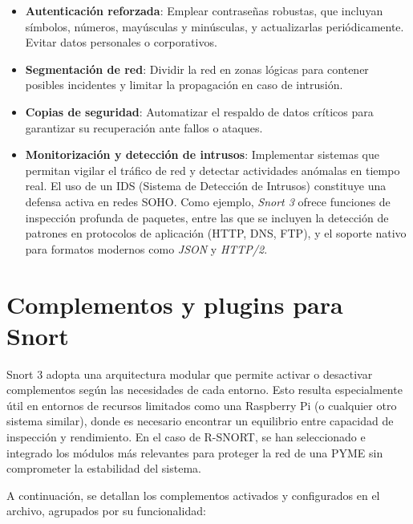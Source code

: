\documentclass[11pt,a4paper,twoside]{report}
\begin{document}
\begin{itemize}[itemsep=6pt]
	\item \textbf{Autenticación reforzada}: Emplear contraseñas robustas, que incluyan símbolos, números, mayúsculas y minúsculas, y actualizarlas periódicamente. Evitar datos personales o corporativos.
	
	\item \textbf{Segmentación de red}: Dividir la red en zonas lógicas para contener posibles incidentes y limitar la propagación en caso de intrusión.
	
	\item \textbf{Copias de seguridad}: Automatizar el respaldo de datos críticos para garantizar su recuperación ante fallos o ataques.
	
	\item \textbf{Monitorización y detección de intrusos}: Implementar sistemas que permitan vigilar el tráfico de red y detectar actividades anómalas en tiempo real. El uso de un IDS (Sistema de Detección de Intrusos) constituye una defensa activa en redes SOHO. Como ejemplo, \textit{Snort 3} ofrece funciones de inspección profunda de paquetes, entre las que se incluyen la detección de patrones en protocolos de aplicación (HTTP, DNS, FTP), y el soporte nativo para formatos modernos como \textit{JSON} y \textit{HTTP/2}.
\end{itemize}

\section{Complementos y plugins para Snort}

Snort 3 adopta una arquitectura modular que permite activar o desactivar complementos según las necesidades de cada entorno. Esto resulta especialmente útil en entornos de recursos limitados como una Raspberry Pi (o cualquier otro sistema similar), donde es necesario encontrar un equilibrio entre capacidad de inspección y rendimiento. En el caso de R-SNORT, se han seleccionado e integrado los módulos más relevantes para proteger la red de una PYME sin comprometer la estabilidad del sistema.\newline

A continuación, se detallan los complementos activados y configurados en el archivo, agrupados por su funcionalidad:
\end{document}
